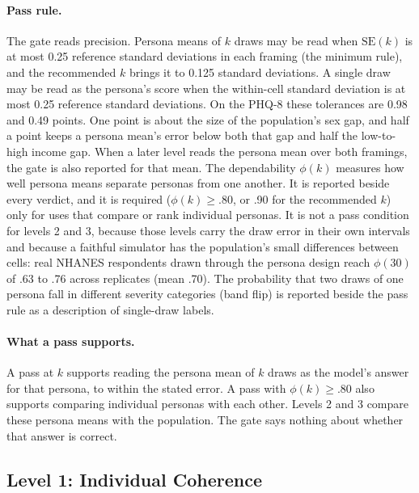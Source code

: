\paragraph{Pass rule.}
The gate reads precision.
Persona means of $k$ draws may be read when $\mathrm{SE}(k)$ is at most 0.25 reference standard deviations in each framing (the minimum rule), and the recommended $k$ brings it to 0.125 standard deviations.
A single draw may be read as the persona's score when the within-cell standard deviation is at most 0.25 reference standard deviations.
On the PHQ-8 these tolerances are 0.98 and 0.49 points.
One point is about the size of the population's sex gap, and half a point keeps a persona mean's error below both that gap and half the low-to-high income gap. %
When a later level reads the persona mean over both framings, the gate is also reported for that mean.
The dependability $\phi(k)$ measures how well persona means separate personas from one another.
It is reported beside every verdict, and it is required ($\phi(k) \ge .80$, or .90 for the recommended $k$) only for uses that compare or rank individual personas.
It is not a pass condition for levels 2 and 3, because those levels carry the draw error in their own intervals and because a faithful simulator has the population's small differences between cells: real NHANES respondents drawn through the persona design reach $\phi(30)$ of .63 to .76 across replicates (mean .70). %
The probability that two draws of one persona fall in different severity categories (band flip) is reported beside the pass rule as a description of single-draw labels.

\paragraph{What a pass supports.}
A pass at $k$ supports reading the persona mean of $k$ draws as the model's answer for that persona, to within the stated error.
A pass with $\phi(k) \ge .80$ also supports comparing individual personas with each other.
Levels 2 and 3 compare these persona means with the population.
The gate says nothing about whether that answer is correct.

\subsection*{Level 1: Individual Coherence}
\label{sec:s7-l1}

